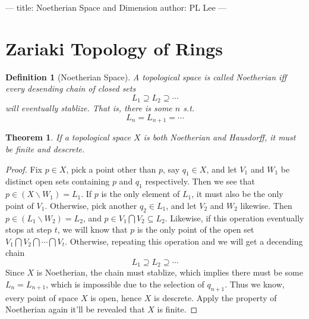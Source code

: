---
title: Noetherian Space and Dimension
author: PL Lee
---

\usepackage{amsmath}
\usepackage{amssymb}
\usepackage{amsthm}
\newtheorem{def}{Definition}
\newtheorem{thm}{Theorem}
\newtheorem{lem}{Lemma}
\newtheorem{prp}{Proposition}
\newtheorem{rem}{Remark}

\newcommand{\spec}[1]{\mathfrak{Spec}(#1)}




\section{Zariaki Topology of Rings}
\begin{def}[Noetherian Space]
    A topological space is called Noetherian iff every desending chain of closed sets
    \[ L_1\supseteq L_2\supseteq\cdots \]
    will eventually stablize. That is, there is some $n$ s.t.
    \[ L_n=L_{n+1}=\cdots \]
\end{def}

\begin{thm}
    If a topological space $X$ is both Noetherian and Hausdorff, it must be finite and descrete.
\end{thm}
\begin{proof}
    Fix $p\in X$, pick a point other than $p$, say $q_1\in X$, and let $V_1$ and $W_1$ be distinct open sets containing $p$ and $q_1$ respectively. Then we see that $p\in(X\backslash W_1)=L_1$. If $p$ is the only element of $L_1$, it must also be the only point of $V_1$. Otherwise, pick another $q_2\in L_1$, and let $V_2$ and $W_2$ likewise. Then $p\in(L_1\backslash W_2)=L_2$, and $p\in V_1\bigcap V_2\subseteq L_2$. Likewise, if this operation eventually stops at step $t$, we will know that $p$ is the only point of the open set $V_1\bigcap V_2\bigcap\cdots\bigcap V_t$. Otherwise, repeating this operation and we will get a decending chain
    \[ L_1\supseteq L_2\supseteq\cdots \]
    Since $X$ is Noetherian, the chain must stablize, which implies there must be some $L_n=L_{n+1}$, which is impossible due to the selection of $q_{n+1}$. Thus we know, every point of space $X$ is open, hence $X$ is descrete. Apply the property of Noetherian again it'll be revealed that $X$ is finite.
\end{proof}

